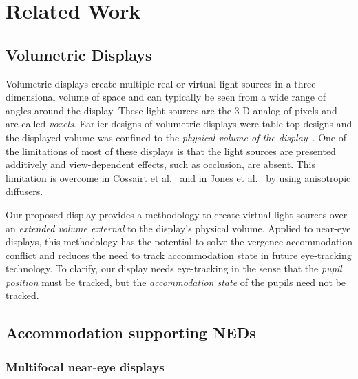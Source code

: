 \section{Related Work}
\label{sec:volumetric:related_work}

\subsection{Volumetric Displays}
\label{sec:volumetric:volumetric_displays}

Volumetric displays create multiple real or virtual light sources in a three-dimensional volume of space and can typically be seen from a wide range of angles around the display. These light sources are the 3-D analog of pixels and are called \emph{voxels}. Earlier designs of volumetric displays were table-top designs and the displayed volume was confined to the \emph{physical volume of the display}~\cite{Favalora2002100, Sullivan2004Depthcube, Cossairt2007Geometric, Ochiai2016Fairy, Refai2009Static, Smalley2018photophoretic}. One of the limitations of most of these displays is that the light sources are presented additively and view-dependent effects, such as occlusion, are absent. This limitation is overcome in Cossairt et al.~\cite{Cossairt2007Geometric} and in Jones et al.~\cite{Jones2007Rendering} by using anisotropic diffusers.

Our proposed display provides a methodology to create virtual light sources over an \emph{extended volume external} to the display's physical volume. Applied to near-eye displays, this methodology has the potential to solve the vergence-accommodation conflict and reduces the need to track accommodation state in future eye-tracking technology. To clarify, our display needs eye-tracking in the sense that the \emph{pupil position} must be tracked, but the \emph{accommodation state} of the pupils need not be tracked.

\subsection{Accommodation supporting NEDs}
\label{sec:volumetric:accommodation_neds}
\subsubsection{Multifocal near-eye displays}
\label{sec:volumetric:multifocal_displays}

